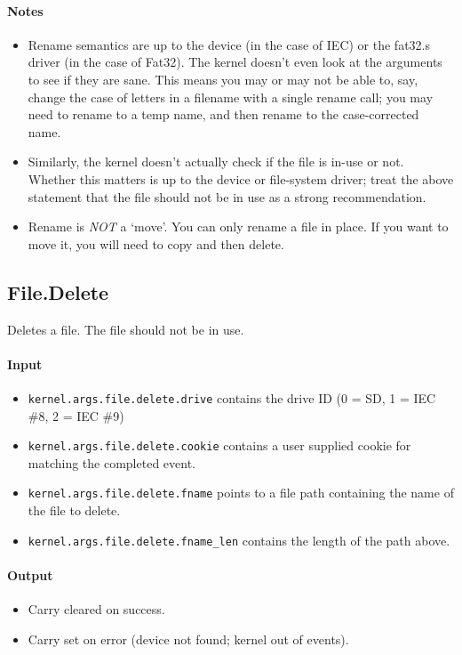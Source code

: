 \paragraph{Notes}
\begin{itemize}
\item Rename semantics are up to the device (in the case of IEC) or the fat32.s driver (in the case of Fat32).  The kernel doesn't even look at the arguments to see if they are sane.  This means you may or may not be able to, say, change the case of letters in a filename with a single rename call; you may need to rename to a temp name, and then rename to the case-corrected name.

\item Similarly, the kernel doesn't actually check if the file is in-use or not.  Whether this matters is up to the device or file-system driver; treat the above statement that the file should not be in use as a strong recommendation. 

\item Rename is {\em NOT} a `move'.  You can only rename a file in place.  If you want to move it, you will need to copy and then delete.
\end{itemize}

\subsection*{File.Delete}
Deletes a file.  The file should not be in use.

\paragraph{Input}
\begin{itemize}
\item \verb+kernel.args.file.delete.drive+ contains the drive ID (0 = SD, 1 = IEC \#8, 2 = IEC \#9)
\item \verb+kernel.args.file.delete.cookie+ contains a user supplied cookie for matching the completed event.
\item \verb+kernel.args.file.delete.fname+ points to a file path containing the name of the file to delete.
\item \verb+kernel.args.file.delete.fname_len+ contains the length of the path above.
\end{itemize}

\paragraph{Output}
\begin{itemize}
\item Carry cleared on success.
\item Carry set on error (device not found; kernel out of events).
\end{itemize}

